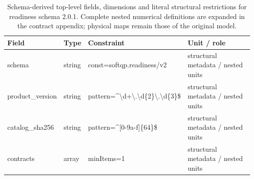 \begin{table}[htbp]\centering\footnotesize
\caption{Schema-derived top-level fields, dimensions and literal structural restrictions for readiness schema 2.0.1. Complete nested numerical definitions are expanded in the contract appendix; physical maps remain those of the original model.}\label{tab:contract-readiness}
\begin{tabularx}{\textwidth}{@{}>{\raggedright\arraybackslash}p{}>{\raggedright\arraybackslash}p{}>{\raggedright\arraybackslash}X>{\raggedright\arraybackslash}X@{}}\toprule
Field & Type & Constraint & Unit / role\\\midrule
schema & string & const=\allowbreak{}softqp.\allowbreak{}readiness/\allowbreak{}v2 & structural metadata /\allowbreak{} nested units\\
product\_\allowbreak{}version & string & pattern=\allowbreak{}\textasciicircum{}\textbackslash{}d+\textbackslash{}.\allowbreak{}\textbackslash{}d\{2\}\textbackslash{}.\allowbreak{}\textbackslash{}d\{3\}\$ & structural metadata /\allowbreak{} nested units\\
catalog\_\allowbreak{}sha256 & string & pattern=\allowbreak{}\textasciicircum{}[0-9a-\allowbreak{}f]\{64\}\$ & structural metadata /\allowbreak{} nested units\\
contracts & array & minItems=\allowbreak{}1 & structural metadata /\allowbreak{} nested units\\
\bottomrule\end{tabularx}
\end{table}
